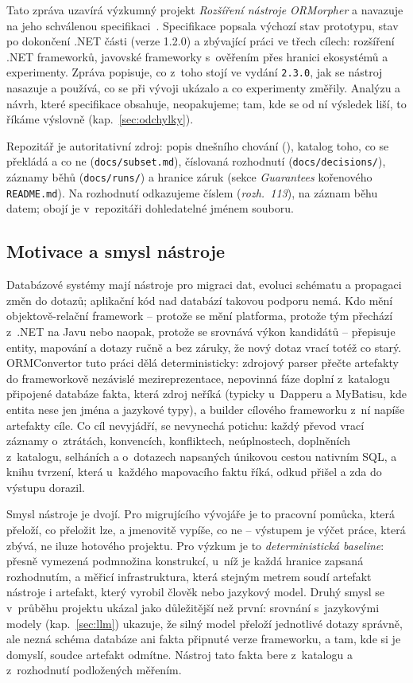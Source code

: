 \documentclass{article}
\begin{document}
Tato zpráva uzavírá výzkumný projekt \emph{Rozšíření nástroje ORMorpher} a navazuje na jeho schválenou specifikaci~\cite{spec}. Specifikace popsala výchozí stav prototypu, stav po dokončení .NET části (verze 1.2.0) a zbývající práci ve třech cílech: rozšíření .NET frameworků, javovské frameworky s~ověřením přes hranici ekosystémů a experimenty. Zpráva popisuje, co z~toho stojí ve vydání \texttt{2.3.0}, jak se nástroj nasazuje a používá, co se při vývoji ukázalo a co experimenty změřily. Analýzu a návrh, které specifikace obsahuje, neopakujeme; tam, kde se od ní výsledek liší, to říkáme výslovně (kap.~\ref{sec:odchylky}).

Repozitář je autoritativní zdroj: popis dnešního chování (), katalog toho, co se překládá a co ne (\texttt{docs/subset.md}), číslovaná rozhodnutí (\texttt{docs/decisions/}), záznamy běhů (\texttt{docs/runs/}) a hranice záruk (sekce \emph{Guarantees} kořenového \texttt{README.md}). Na rozhodnutí odkazujeme číslem (\emph{rozh.~113}), na záznam běhu datem; obojí je v~repozitáři dohledatelné jménem souboru.

\subsection{Motivace a smysl nástroje}

Databázové systémy mají nástroje pro migraci dat, evoluci schématu a propagaci změn do dotazů; aplikační kód nad databází takovou podporu nemá. Kdo mění objektově-relační framework -- protože se mění platforma, protože tým přechází z~.NET na Javu nebo naopak, protože se srovnává výkon kandidátů -- přepisuje entity, mapování a dotazy ručně a bez záruky, že nový dotaz vrací totéž co starý. ORMConvertor tuto práci dělá deterministicky: zdrojový parser přečte artefakty do frameworkově nezávislé mezireprezentace, nepovinná fáze doplní z~katalogu připojené databáze fakta, která zdroj neříká (typicky u~Dapperu a MyBatisu, kde entita nese jen jména a jazykové typy), a builder cílového frameworku z~ní napíše artefakty cíle. Co cíl nevyjádří, se nevynechá potichu: každý převod vrací záznamy o~ztrátách, konvencích, konfliktech, neúplnostech, doplněních z~katalogu, selháních a o~dotazech napsaných únikovou cestou nativním SQL, a knihu tvrzení, která u~každého mapovacího faktu říká, odkud přišel a zda do výstupu dorazil.

Smysl nástroje je dvojí. Pro migrujícího vývojáře je to pracovní pomůcka, která přeloží, co přeložit lze, a jmenovitě vypíše, co ne -- výstupem je výčet práce, která zbývá, ne iluze hotového projektu. Pro výzkum je to \emph{deterministická baseline}: přesně vymezená podmnožina konstrukcí, u~níž je každá hranice zapsaná rozhodnutím, a měřicí infrastruktura, která stejným metrem soudí artefakt nástroje i artefakt, který vyrobil člověk nebo jazykový model. Druhý smysl se v~průběhu projektu ukázal jako důležitější než první: srovnání s~jazykovými modely (kap.~\ref{sec:llm}) ukazuje, že silný model přeloží jednotlivé dotazy správně, ale nezná schéma databáze ani fakta připnuté verze frameworku, a tam, kde si je domyslí, soudce artefakt odmítne. Nástroj tato fakta bere z~katalogu a z~rozhodnutí podložených měřením.
\end{document}
